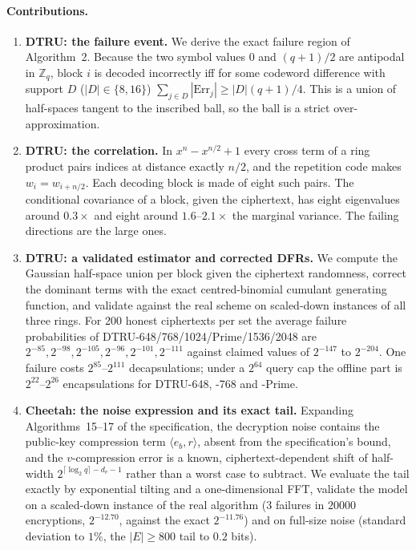 \documentclass[11pt,a4paper]{article}
\theoremstyle{definition}
\theoremstyle{remark}
\newcommand{\Err}{\mathrm{Err}}
\newcommand{\Z}{\mathbb{Z}}
\begin{document}
\paragraph{Contributions.}
\begin{enumerate}
\item \textbf{DTRU: the failure event.} We derive the exact failure region
of Algorithm~2. Because the two symbol values $0$ and $(q+1)/2$ are antipodal
in $\Z_q$, block $i$ is decoded incorrectly iff for some codeword difference
with support $D$ ($|D|\in\{8,16\}$)
$\sum_{j\in D}|\Err_j|\ge |D|(q+1)/4$. This is a union of half-spaces
tangent to the inscribed ball, so the ball is a strict over-approximation.
\item \textbf{DTRU: the correlation.} In $x^n-x^{n/2}+1$ every cross term
of a ring product pairs indices at distance exactly $n/2$, and the
repetition code makes $w_i=w_{i+n/2}$. Each decoding block is made of eight
such pairs. The conditional covariance of a block, given the ciphertext, has
eight eigenvalues around $0.3\times$ and eight around $1.6$--$2.1\times$ the
marginal variance. The failing directions are the large ones.
\item \textbf{DTRU: a validated estimator and corrected DFRs.} We compute
the Gaussian half-space union per block given the ciphertext randomness,
correct the dominant terms with the exact centred-binomial cumulant
generating function, and validate against the real scheme on scaled-down
instances of all three rings. For 200 honest ciphertexts per set the
average failure probabilities of DTRU-648/768/1024/Prime/1536/2048 are
$2^{-85},2^{-98},2^{-105},2^{-96},2^{-101},2^{-111}$ against claimed values
of $2^{-147}$ to $2^{-204}$. One failure costs $2^{85}$--$2^{111}$
decapsulations; under a $2^{64}$ query cap the offline part is
$2^{22}$--$2^{26}$ encapsulations for DTRU-648, -768 and -Prime.
\item \textbf{Cheetah: the noise expression and its exact tail.} Expanding
Algorithms~15--17 of the specification, the decryption noise contains the
public-key compression term $\langle e_b,r\rangle$, absent from the
specification's bound, and the $v$-compression error is a known,
ciphertext-dependent shift of half-width $2^{\lceil\log_2 q\rceil-d_v-1}$
rather than a worst case to subtract. We evaluate the tail exactly by
exponential tilting and a one-dimensional FFT, validate the model on a
scaled-down instance of the real algorithm (3 failures in $20000$
encryptions, $2^{-12.70}$, against the exact $2^{-11.76}$) and on full-size
noise (standard deviation to $1\%$, the $|E|\ge800$ tail to $0.2$ bits).

\end{enumerate}
\end{document}
